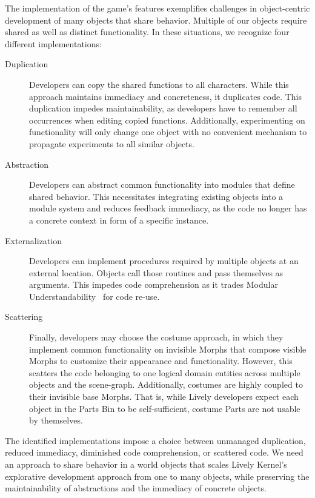 The implementation of the game's features exemplifies challenges in
object-centric development of many objects that share behavior. Multiple
of our objects require shared as well as distinct functionality. In these situations, we recognize four different implementations:

\begin{description}
\item[Duplication] Developers can copy the shared functions to all
  characters.  While this approach maintains immediacy and concreteness, it duplicates code. This duplication impedes maintainability, as developers have
  to remember all occurrences when editing copied
  functions. Additionally, experimenting on functionality will only
  change one object with no convenient mechanism to propagate experiments
  to all similar objects.
\item[Abstraction] Developers can abstract common functionality into
  modules that define shared behavior. This necessitates integrating
  existing objects into a module system and reduces feedback
  immediacy, as the code no longer has a concrete context in form of a
  specific instance.
\item[Externalization] Developers can implement procedures required by multiple objects at an external location. Objects call those routines and
  pass themselves as arguments. This impedes code comprehension as it
  trades Modular Understandability~\cite{Meyer1997} for code re-use.
\item[Scattering] Finally, developers may choose the costume approach,
  in which they implement common functionality on invisible Morphs
  that compose visible Morphs to customize their appearance and
  functionality. However, this scatters the code belonging to one
  logical domain entities across multiple objects and the scene-graph.
  Additionally, costumes are highly coupled to their invisible base Morphs. 
  That is, while Lively developers expect each object in the Parts Bin to be 
  self-sufficient, costume Parts are not usable by themselves.
\end{description}

The identified implementations impose a choice between unmanaged
duplication, reduced immediacy, diminished code comprehension, or
scattered code. We need an approach to share behavior in a world
objects that scales Lively Kernel's explorative development approach
from one to many objects, while preserving the maintainability of
abstractions and the immediacy of concrete objects.


